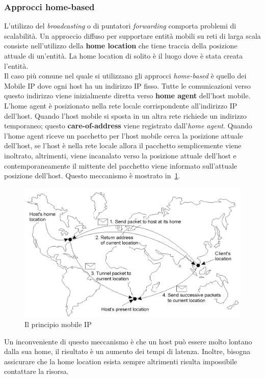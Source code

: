 \subsubsection{Approcci home-based}
L'utilizzo del \emph{broadcasting} o di puntatori \emph{forwarding} comporta problemi di scalabilità. Un approccio diffuso per supportare entità mobili su reti di larga scala consiste nell'utilizzo della \textbf{home location} che tiene traccia della posizione attuale di un'entità. La home location di solito è il luogo dove è stata creata l'entità.\\
Il caso più comune nel quale si utilizzano gli approcci \emph{home-based} è quello dei Mobile IP dove ogni host ha un indirizzo IP fisso. Tutte le comunicazioni verso questo indirizzo viene inizialmente diretta verso \textbf{home agent} dell'host mobile. L'home agent è posizionato nella rete locale corrispondente all'indirizzo IP dell'host. Quando l'host mobile si sposta in un altra rete richiede un indirizzo temporaneo; questo \textbf{care-of-address} viene registrato dall'\emph{home agent}. Quando l'home agent riceve un pacchetto per l'host mobile cerca la posizione attuale dell'host, se l'host è nella rete locale allora il pacchetto semplicemente viene inoltrato, altrimenti, viene incanalato verso la posizione attuale dell'host e contemporaneamente il mittente del pacchetto viene informato sull'attuale posizione dell'host. Questo meccanismo è mostrato in \figurename\,\ref{img:homebase}.\\
\begin{figure}
\centering
\includegraphics[scale=0.5]{img/homebase.png}
\caption{Il principio mobile IP}\label{img:homebase}
\end{figure}
Un inconveniente di questo meccanismo è che un host può essere molto lontano dalla sua home, il risultato è un aumento dei tempi di latenza. Inoltre, bisogna assicurare che la home location esista sempre altrimenti risulta impossibile contattare la risorsa.
